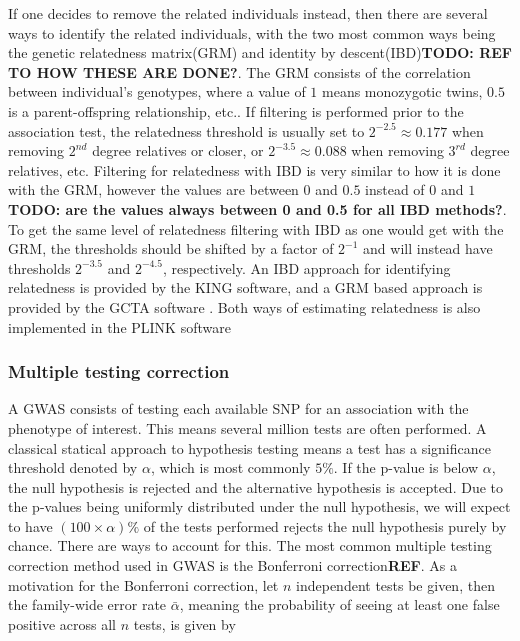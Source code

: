 If one decides to remove the related individuals instead, then there are several ways to identify the related individuals, with the 
two most common ways being the genetic relatedness matrix(GRM) and identity by descent(IBD)\textbf{TODO: REF TO HOW THESE ARE DONE?}. 
The GRM consists of the correlation between individual's genotypes, where a value of $ 1 $ means monozygotic twins, $ 0.5 $ is a 
parent-offspring relationship, etc.. If filtering is performed prior to the association test, the relatedness threshold is usually set 
to $ 2^{-2.5} \approx 0.177 $ when removing $ 2^{nd} $ degree relatives or closer, or $ 2^{-3.5} \approx 0.088 $ when removing $ 
3^{rd} $ degree relatives, etc. Filtering for relatedness with IBD is very similar to how it is done with the GRM, however the values 
are between $ 0 $ and $ 0.5 $ instead of $ 0 $ and $ 1 $ \textbf{TODO: are the values always between 0 and 0.5 for all IBD methods?}. 
To get the same level of relatedness filtering with IBD as one would get with the GRM, the thresholds should be shifted by a factor of 
$ 2^{-1} $ and will instead have thresholds $ 2^{-3.5} $ and $ 2^{-4.5} $, respectively. An IBD approach for identifying relatedness 
is provided by the KING software\cite{manichaikul2010robust}, and a GRM based approach is provided by the GCTA software 
\cite{yang2011gcta}. Both ways of estimating relatedness is also implemented in the PLINK 
software\cite{chang2015second,purcell2007plink}


\subsubsection{Multiple testing correction}
A GWAS consists of testing each available SNP for an association with the phenotype of interest. This means several million tests are often performed. A classical statical approach to hypothesis testing means a test has a significance threshold denoted by $ \alpha $, which is most commonly $ 5\% $. If the p-value is below $ \alpha $, the null hypothesis is rejected and the alternative hypothesis is accepted. Due to the p-values being uniformly distributed under the null hypothesis, we will expect to have $ (100\times \alpha) \%$ of the tests performed rejects the null hypothesis purely by chance. There are ways to account for this. The most common multiple testing correction method used in GWAS is the Bonferroni correction\textbf{REF}. As a motivation for the Bonferroni correction, let $ n $ independent tests be given, then the family-wide error rate $ \bar{\alpha} $, meaning the probability of seeing at least one false positive across all $ n $ tests, is given by

